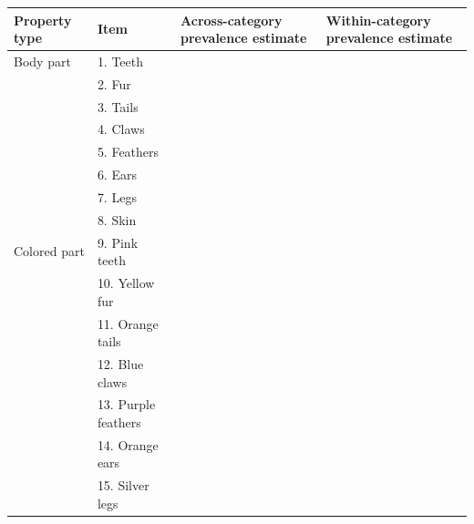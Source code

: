 \documentclass[10pt,letterpaper]{article}
\begin{document}
\begin{table}[h]
\begin{tabular}{| l || l | l | l |}
\hline
Property type               & Item                    & Across-category prevalence estimate  & Within-category prevalence estimate \\
\hline \hline
Body part       			& 1. Teeth    &   &                     \\
                                          & 2. Fur                       &                &                     \\
                                          & 3. Tails                     &                &                     \\
                                          & 4. Claws                       &                &                     \\
                                          & 5. Feathers                       &                &                     \\
                                          & 6. Ears                       &                &                     \\
                                          & 7. Legs                       &                &                     \\
                                          & 8. Skin                       &                &                     \\
Colored part      	 & 9. Pink teeth       &                &                     \\
                                          & 10. Yellow fur                       &                &                     \\
                                          & 11. Orange tails                         &                &                     \\
                                          & 12. Blue claws                       &                &                     \\
                                          & 13. Purple feathers                      &                &                     \\
                                          & 14. Orange ears                    &                &                     \\
                                          & 15. Silver legs                       &                &                     \\

\end{tabular}
\end{table}
\end{document}
